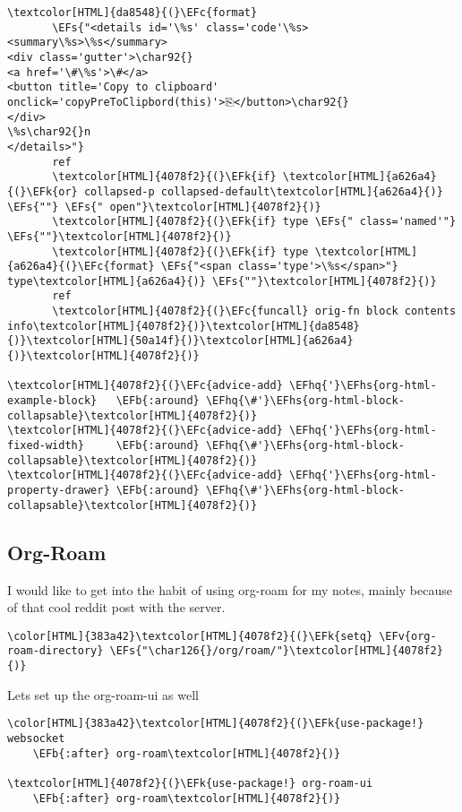 \documentclass{scrartcl}
\newcommand{\EFk}[1]{\textcolor{EFk}{#1}} %
\newcommand{\EFs}[1]{\textcolor{EFs}{#1}} %
\newcommand{\EFb}[1]{\textcolor{EFb}{#1}} %
\newcommand{\EFc}[1]{\textcolor{EFc}{#1}} %
\newcommand{\EFv}[1]{\textcolor{EFv}{#1}} %
\newcommand{\EFhq}[1]{\textcolor{EFhq}{#1}} %
\newcommand{\EFhs}[1]{\textcolor{EFhs}{#1}} %
\begin{document}
\begin{Code}
\begin{Verbatim}[]
      \textcolor[HTML]{da8548}{(}\EFc{format}
       \EFs{"<details id='\%s' class='code'\%s>
<summary\%s>\%s</summary>
<div class='gutter'>\char92{}
<a href='\#\%s'>\#</a>
<button title='Copy to clipboard' onclick='copyPreToClipbord(this)'>⎘</button>\char92{}
</div>
\%s\char92{}n
</details>"}
       ref
       \textcolor[HTML]{4078f2}{(}\EFk{if} \textcolor[HTML]{a626a4}{(}\EFk{or} collapsed-p collapsed-default\textcolor[HTML]{a626a4}{)} \EFs{""} \EFs{" open"}\textcolor[HTML]{4078f2}{)}
       \textcolor[HTML]{4078f2}{(}\EFk{if} type \EFs{" class='named'"} \EFs{""}\textcolor[HTML]{4078f2}{)}
       \textcolor[HTML]{4078f2}{(}\EFk{if} type \textcolor[HTML]{a626a4}{(}\EFc{format} \EFs{"<span class='type'>\%s</span>"} type\textcolor[HTML]{a626a4}{)} \EFs{""}\textcolor[HTML]{4078f2}{)}
       ref
       \textcolor[HTML]{4078f2}{(}\EFc{funcall} orig-fn block contents info\textcolor[HTML]{4078f2}{)}\textcolor[HTML]{da8548}{)}\textcolor[HTML]{50a14f}{)}\textcolor[HTML]{a626a4}{)}\textcolor[HTML]{4078f2}{)}

\textcolor[HTML]{4078f2}{(}\EFc{advice-add} \EFhq{'}\EFhs{org-html-example-block}   \EFb{:around} \EFhq{\#'}\EFhs{org-html-block-collapsable}\textcolor[HTML]{4078f2}{)}
\textcolor[HTML]{4078f2}{(}\EFc{advice-add} \EFhq{'}\EFhs{org-html-fixed-width}     \EFb{:around} \EFhq{\#'}\EFhs{org-html-block-collapsable}\textcolor[HTML]{4078f2}{)}
\textcolor[HTML]{4078f2}{(}\EFc{advice-add} \EFhq{'}\EFhs{org-html-property-drawer} \EFb{:around} \EFhq{\#'}\EFhs{org-html-block-collapsable}\textcolor[HTML]{4078f2}{)}
\end{Verbatim}
\end{Code}

\subsection{Org-Roam}
\label{sec:org823e025}
I would like to get into the habit of using org-roam for my notes, mainly because of that cool reddit post with the server.
\begin{Code}
\begin{Verbatim}[]
\color[HTML]{383a42}\textcolor[HTML]{4078f2}{(}\EFk{setq} \EFv{org-roam-directory} \EFs{"\char126{}/org/roam/"}\textcolor[HTML]{4078f2}{)}
\end{Verbatim}
\end{Code}

Lets set up the org-roam-ui as well
\begin{Code}
\begin{Verbatim}[]
\color[HTML]{383a42}\textcolor[HTML]{4078f2}{(}\EFk{use-package!} websocket
    \EFb{:after} org-roam\textcolor[HTML]{4078f2}{)}

\textcolor[HTML]{4078f2}{(}\EFk{use-package!} org-roam-ui
    \EFb{:after} org-roam\textcolor[HTML]{4078f2}{)}
\end{Verbatim}
\end{Code}
\end{document}
